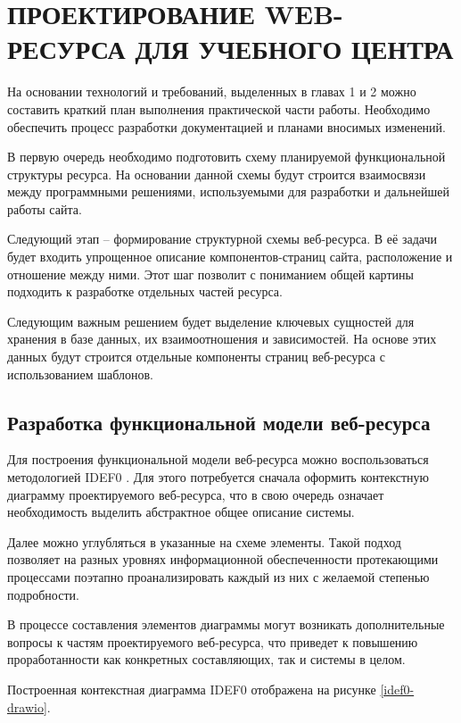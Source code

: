\section{ПРОЕКТИРОВАНИЕ WEB-РЕСУРСА ДЛЯ УЧЕБНОГО ЦЕНТРА}

На основании технологий и требований, выделенных в главах 1 и 2 можно составить краткий план выполнения практической части работы.
Необходимо обеспечить процесс разработки документацией и планами вносимых изменений.

В первую очередь необходимо подготовить схему планируемой функциональной структуры ресурса.
На основании данной схемы будут строится взаимосвязи между программными решениями, используемыми для разработки и дальнейшей работы сайта.

Следующий этап -- формирование структурной схемы веб-ресурса.
В её задачи будет входить упрощенное описание компонентов-страниц сайта, расположение и отношение между ними.
Этот шаг позволит с пониманием общей картины подходить к разработке отдельных частей ресурса.

Следующим важным решением будет выделение ключевых сущностей для хранения в базе данных, их взаимоотношения и зависимостей.
На основе этих данных будут строится отдельные компоненты страниц веб-ресурса с использованием шаблонов.


\subsection{Разработка функциональной модели веб-ресурса}

Для построения функциональной модели веб-ресурса можно воспользоваться методологией IDEF0 \cite{wiki-idef0}.
Для этого потребуется сначала оформить контекстную диаграмму проектируемого веб-ресурса, что в свою очередь означает необходимость выделить абстрактное общее описание системы.

Далее можно углубляться в указанные на схеме элементы.
Такой подход позволяет на разных уровнях информационной обеспеченности протекающими процессами поэтапно проанализировать каждый из них с желаемой степенью подробности.

В процессе составления элементов диаграммы могут возникать дополнительные вопросы к частям проектируемого веб-ресурса, что приведет к повышению проработанности как конкретных составляющих, так и системы в целом.

Построенная контекстная диаграмма IDEF0 отображена на рисунке \ref{idef0-drawio}.


